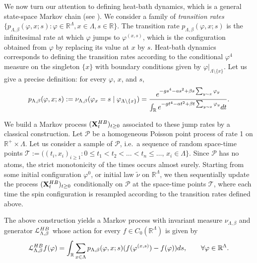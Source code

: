 \documentclass[11pt,a4paper]{article}
\theoremstyle{definition}
\numberwithin{equation}{section}
\begin{document}
We now turn our attention to defining heat-bath dynamics, which is a general state-space Markov chain (see \cite{meyn2012markov}). We consider a family of \emph{transition rates}  $\{ p_{\Lambda,\beta}(\varphi, x;s) :\varphi \in \mathbb R^\Lambda, x \in \Lambda, s \in \mathbb R \}$. The transition rate $p_{\Lambda,\beta}(\varphi,x;s)$ is the infinitesimal rate at which $\varphi$ jumps to $\varphi^{(x,s)}$, which is the configuration obtained from $\varphi$ by replacing its value at $x$ by $s$. Heat-bath dynamics corresponds to defining the transition rates according to the conditional $\varphi^4$ measure on the singleton $\{x\}$ with boundary conditions given by $\varphi|_{\Lambda\setminus\{x\}}$. Let us give a precise definition: for every $\varphi$, $x$, and $s$, 
\begin{equation}
p_{\Lambda,\beta}(\varphi, x; s) := \nu_{\Lambda, \beta} (\varphi_x = s \mid \varphi_{\Lambda\setminus\{x\}}) = \frac{e^{ - gs^4-as^2 + \beta s \sum_{y \sim x}\varphi_y}}{\int_{\mathbb R} e^{- gt^4-at^2 + \beta t \sum_{y \sim x}\varphi_y} {\rm d}t }.
\end{equation}

We build a Markov process $(\mathbf X^{\rm HB}_t)_{t \geq 0}$ associated to these jump rates by a classical construction. Let $\mathcal P$ be a homogeneous Poisson point process of rate 1 on $\mathbb R^+\times \Lambda$. Let us consider a sample of $\mathcal P$, i.e.\ a sequence of random space-time points $\mathcal T:= ( (t_i,x_i)_{i \geq 1} : 0\leq  t_1 < t_2 < \dots < t_n \leq \dots, \, x_i \in \Lambda\}$. Since $\mathcal P$ has no atoms, the strict monotonicity of the times occurs almost surely. Starting from some initial configuration $\varphi^0$, or initial law $\tilde \nu$ on $\mathbb R^\Lambda$, we then sequentially update the process $(\mathbf X_t^{\rm HB})_{t \geq 0}$ conditionally on $\mathcal P$ at the space-time points $\mathcal T$, where each time the spin configuration is resampled according to the transition rates defined above. 


The above construction yields a Markov process with invariant measure $\nu_{\Lambda,\beta}$ and generator $\mathcal L_{\Lambda,\beta}^{\rm HB}$ whose action for every $f \in C_0(\mathbb R^\Lambda)$ is given by
\begin{equation}
\mathcal L_{\Lambda,\beta}^{\rm HB} f(\varphi) = \int_{\mathbb R} \sum_{x \in \Lambda} p_{\Lambda,\beta}(\varphi,x;s)(f(\varphi^{(x,s)})-f(\varphi)) {\rm d}s, \qquad \forall \varphi \in \mathbb R^\Lambda. 
\end{equation}
\end{document}
